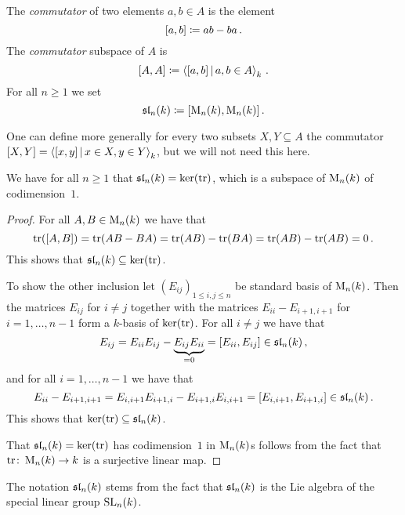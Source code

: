 \begin{definition}
  The \emph{commutator} of two elements $a, b \in A$ is the element
  \[
              [a,b]
    \coloneqq  ab - ba \,.
  \]
  The \emph{commutator} subspace of $A$ is
  \[
              [A,A]
    \defined  \gen{ [a,b] \suchthat a, b \in A }_k \,.
  \]
  For all $n \geq 1$ we set
  \[
              \operatorname{\mathfrak{sl}}_n(k)
    \coloneqq  [ \operatorname{M}_n(k), \operatorname{M}_n(k) ] \,.
  \]
\end{definition}


\begin{remark}
  One can define more generally for every two subsets $X, Y \subseteq A$ the commutator $[X, Y] = \gen{ [x,y] \suchthat x \in X, y \in Y}_k$, but we will not need this here.
\end{remark}


\begin{lemma}
  We have for all $n \geq 1$ that $\operatorname{\mathfrak{sl}}_n(k) = \ker(\operatorname{tr})$, which is a subspace of $\operatorname{M}_n(k)$ of codimension~$1$.
\end{lemma}


\begin{proof}
  For all $A, B \in \operatorname{M}_n(k)$ we have that
  \[
      \operatorname{tr}( [A,B] )
    = \operatorname{tr}(AB - BA)
    = \operatorname{tr}(AB) - \operatorname{tr}(BA)
    = \operatorname{tr}(AB) - \operatorname{tr}(AB)
    = 0 \,.
  \]
  This shows that $\operatorname{\mathfrak{sl}}_n(k) \subseteq \ker(\operatorname{tr})$.
  
  To show the other inclusion let $(E_{ij})_{1 \leq i,j \leq n}$ be standard basis of $\operatorname{M}_n(k)$.
  Then the matrices $E_{ij}$ for $i \neq j$ together with the matrices $E_{ii} - E_{i+1,i+1}$ for $i = 1, \dotsc, n-1$ form a $k$-basis of $\ker(\operatorname{tr})$.
  For all  $i \neq j$ we have that
  \[
        E_{ij}
    =   E_{ii} E_{ij} - \underbrace{E_{ij} E_{ii}}_{=0}
    =   [E_{ii}, E_{ij}]
    \in \operatorname{\mathfrak{sl}}_n(k) \,,
  \]
  and for all $i = 1, \dotsc, n-1$ we have that
  \[
        E_{ii} - E_{i+1,i+1}
    =   E_{i,i+1} E_{i+1,i} - E_{i+1,i} E_{i,i+1}
    =   [E_{i,i+1}, E_{i+1,i}]
    \in \operatorname{\mathfrak{sl}}_n(k) \,.
  \]
  This shows that $\ker(\operatorname{tr}) \subseteq \operatorname{\mathfrak{sl}}_n(k)$.
  
  That $\operatorname{\mathfrak{sl}}_n(k) = \ker(\operatorname{tr})$ has codimension~$1$ in $\operatorname{M}_n(k)$s follows from the fact that $\operatorname{tr} \colon \operatorname{M}_n(k) \to k$ is a surjective linear map.
\end{proof}


\begin{remark}
  The notation $\operatorname{\mathfrak{sl}}_n(k)$ stems from the fact that $\operatorname{\mathfrak{sl}}_n(k)$ is the Lie algebra of the special linear group $\operatorname{SL}_n(k)$.
\end{remark}


